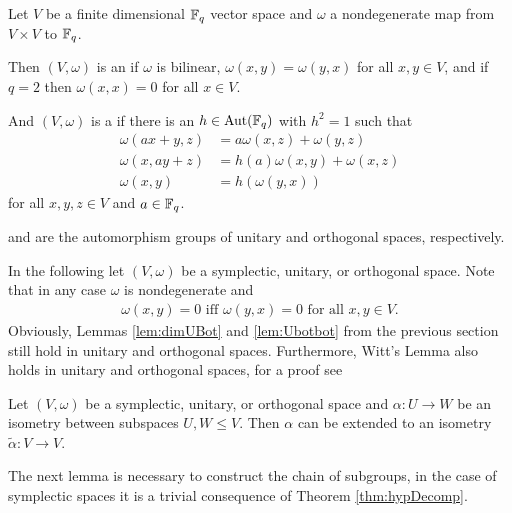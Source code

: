 \begin{definition}
	Let $V$ be a finite dimensional $\mathbb{F}_q$ vector space and $\omega$ a nondegenerate map from $V\times V$ to $\mathbb{F}_q$.
				
	Then $(V,\omega)$ is an  if $\omega$ is bilinear, $\omega(x,y)=\omega(y,x)$ for all $x,y\in V$, and if $q=2$ then $\omega(x,x)=0$ for all $x\in V$.
				
	And $(V,\omega)$ is a  if there is an $h\in\operatorname{Aut}(\mathbb{F}_q)$ with $h^2=1$ such that 
	\begin{align*}
		\omega(ax+y,z) & =a\omega(x,z)+\omega(y,z)    \\
		\omega(x,ay+z) & =h(a)\omega(x,y)+\omega(x,z) \\
		\omega(x,y)    & =h(\omega(y,x))              
	\end{align*}
	for all $x,y,z\in V$ and $a\in\mathbb{F}_q$.
				
	 and  are the automorphism groups of unitary and orthogonal spaces, respectively.
\end{definition}
		
In the following let $(V,\omega)$ be a symplectic, unitary, or orthogonal space.
Note that in any case $\omega$ is nondegenerate and 
\begin{align*}
	\omega(x,y)=0 \text{ iff }\omega(y,x)=0\text{ for all $x,y\in V$}. 
\end{align*}
Obviously, Lemmas \ref{lem:dimUBot} and \ref{lem:Ubotbot} from the previous section still hold in  unitary and orthogonal spaces. Furthermore, Witt's Lemma also holds in unitary and orthogonal spaces, for a proof see \cite{Witt}
\begin{theorem}\label{thm:Witt}
	Let $(V,\omega)$ be a symplectic, unitary, or orthogonal space and $\alpha\colon U\to W$ be an isometry between subspaces $U,W\leq V$.
	Then $\alpha$ can be extended to an isometry $\tilde{\alpha}\colon V\to V$.
\end{theorem}
		
The next lemma is necessary to construct the chain of subgroups, in the case of symplectic spaces it is a trivial consequence of Theorem \ref{thm:hypDecomp}.
		
		
